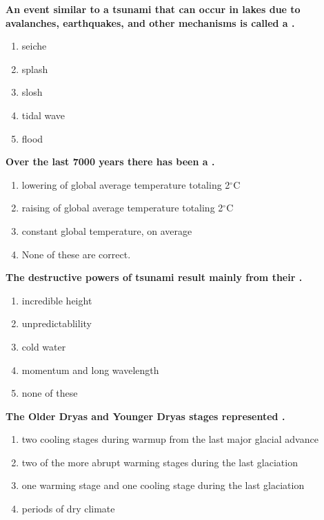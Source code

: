 \item {
\setlength{\itemsep}{0cm}
\setlength{\parskip}{.2cm}
\begin{samepage}
\textbf{
An event similar to a tsunami that can occur in lakes due to avalanches, earthquakes, and other mechanisms is called a \makebox[1cm]{\Rivpt\hrulefill\Rivpt}.
}
\begin{enumerate}
\item { 	seiche }
\item { 	splash }
\item { 	slosh }
\item { 	tidal wave }
\item { 	flood }
\end{enumerate}
\end{samepage}
}
\item {
\setlength{\itemsep}{0cm}
\setlength{\parskip}{.2cm}
\begin{samepage}
\textbf{
Over the last 7000 years there has been a \makebox[1cm]{\Rivpt\hrulefill\Rivpt}.
}
\begin{enumerate}
\item {  lowering of global average temperature totaling 2\ensuremath{^\circ}C }
\item {  raising of global average temperature totaling 2\ensuremath{^\circ}C }
\item {  constant global temperature, on average  }
\item {  None of these are correct. }
\end{enumerate}
\end{samepage}
}
\item {
\setlength{\itemsep}{0cm}
\setlength{\parskip}{.2cm}
\begin{samepage}
\textbf{
The destructive powers of tsunami result mainly from their \makebox[1cm]{\Rivpt\hrulefill\Rivpt}.
}
\begin{enumerate}
\item { 	incredible height }
\item { 	unpredictablility }
\item { 	cold water }
\item { 	momentum and long wavelength }
\item { 	none of these 		 }
\end{enumerate}
\end{samepage}
}
\item {
\setlength{\itemsep}{0cm}
\setlength{\parskip}{.2cm}
\begin{samepage}
\textbf{
The Older Dryas and Younger Dryas stages represented \makebox[1cm]{\Rivpt\hrulefill\Rivpt}.
}
\begin{enumerate}
\item {  two cooling stages during warmup from the last major glacial advance }
\item {  two of the more abrupt warming stages during the last glaciation }
\item {  one warming stage and one cooling stage during the last glaciation }
\item {  periods of dry climate  }
\end{enumerate}
\end{samepage}
}
